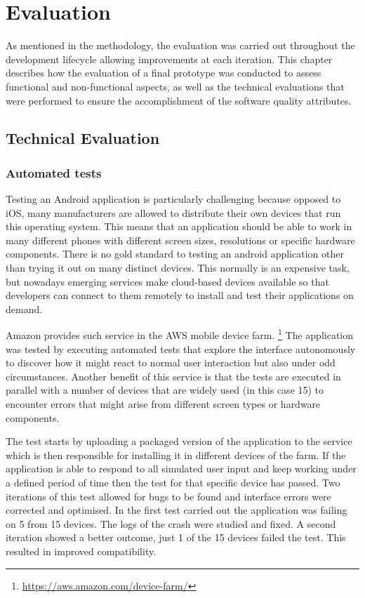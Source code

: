 \chapter{Evaluation}
As mentioned in the methodology, the evaluation was carried out throughout the development lifecycle allowing improvements at each iteration. This chapter describes how the evaluation of a final prototype was conducted to assess functional and non-functional aspects, as well as the technical evaluations that were performed to ensure the accomplishment of the software quality attributes. 

\section{Technical Evaluation}

\subsection{Automated tests}

Testing an Android application is particularly challenging because opposed to iOS, many manufacturers are allowed to distribute their own devices that run this operating system. This means that an application should be able to work in many different phones with different screen sizes, resolutions or specific hardware components. There is no gold standard to testing an android application other than trying it out on many distinct devices. This normally is an expensive task, but nowadays emerging services make cloud-based devices available so that developers can connect to them remotely to install and test their applications on demand.

Amazon provides such service in the AWS mobile device farm. \footnote{\url{https://aws.amazon.com/device-farm/}} The application was tested by executing automated tests that explore the interface autonomously to discover how it might react to normal user interaction but also under odd circumstances. Another benefit of this service is that the tests are executed in parallel with a number of devices that are widely used (in this case 15) to encounter errors that might arise from different screen types or hardware components. 

The test starts by uploading a packaged version of the application to the service which is then responsible for installing it in different devices of the farm. If the application is able to respond to all simulated user input and keep working under a defined period of time then the test for that specific device has passed. Two iterations of this test allowed for bugs to be found and interface errors were corrected and optimised. In the first test carried out the application was failing on 5 from 15 devices. The logs of the crash were studied and fixed. A second iteration showed a better outcome, just 1 of the 15 devices failed the test. This resulted in improved compatibility.   

